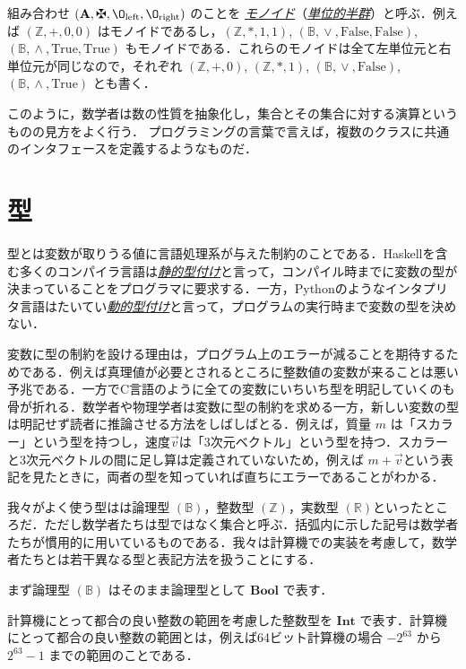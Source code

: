 \documentclass[a4paper]{jsbook}
\newcommand{\programminglanguage}[1]{\textsf{#1}}
\newcommand{\clang}{\programminglanguage{C}}
\newcommand{\haskell}{\programminglanguage{Haskell}}
\newcommand{\python}{\programminglanguage{Python}}
\newcommand{\keyword}[1]{{\underline{\emph{#1}}}}
\newcommand{\mSpecialConst}[1]{\mathrm{#1}} %
\newcommand{\mTrue}{\mSpecialConst{True}}
\newcommand{\mFalse}{\mSpecialConst{False}}
\newcommand{\mZero}{\O}
\newcommand{\mSpecialSub}[1]{\text{#1}}
\newcommand{\mLeft}{\mSpecialSub{left}}
\newcommand{\mRight}{\mSpecialSub{right}}
\newcommand{\mSet}[1]{\mathbf{#1}}
\newcommand{\mSpecialSet}[1]{\mathbb{#1}} %
\newcommand{\mRSet}{\mSpecialSet{R}}
\newcommand{\mZSet}{\mSpecialSet{Z}}
\newcommand{\mBSet}{\mSpecialSet{B}}
\newcommand{\mTupleWith}[1]{\left(#1\right)}
\newcommand{\mType}[1]{\mathbf{#1}}
\newcommand{\mBoolType}{\mType{Bool}}
\newcommand{\mIntType}{\mType{Int}}
\DeclareMathOperator{\mPlus}{\maltese}
\DeclareMathOperator{\mLogicalAnd}{\wedge}
\DeclareMathOperator{\mLogicalOr}{\vee}
\begin{document}
組み合わせ $\mTupleWith{\mSet{A},\mPlus,\mZero_\mLeft,\mZero_\mRight}$ のことを
\keyword{モノイド}（\keyword{単位的半群}）と呼ぶ．例えば $\mTupleWith{\mZSet,+,0,0}$ はモノイドであるし，$\mTupleWith{\mZSet,*,1,1}$, $\mTupleWith{\mBSet,\mLogicalOr,\mFalse,\mFalse}$, $\mTupleWith{\mBSet,\mLogicalAnd,\mTrue,\mTrue}$ もモノイドである．これらのモノイドは全て左単位元と右単位元が同じなので，それぞれ $\mTupleWith{\mZSet,+,0}$, $\mTupleWith{\mZSet,*,1}$, $\mTupleWith{\mBSet,\mLogicalOr,\mFalse}$, $\mTupleWith{\mBSet,\mLogicalAnd,\mTrue}$ とも書く．

このように，数学者は数の性質を抽象化し，集合とその集合に対する演算というものの見方をよく行う．
プログラミングの言葉で言えば，複数のクラスに共通のインタフェースを定義するようなものだ．

\section{型}

型とは変数が取りうる値に言語処理系が与えた制約のことである．\haskell を含む多くのコンパイラ言語は\keyword{静的型付け}と言って，コンパイル時までに変数の型が決まっていることをプログラマに要求する．一方，\python のようなインタプリタ言語はたいてい\keyword{動的型付け}と言って，プログラムの実行時まで変数の型を決めない．

変数に型の制約を設ける理由は，プログラム上のエラーが減ることを期待するためである．例えば真理値が必要とされるところに整数値の変数が来ることは悪い予兆である．一方で\clang 言語のように全ての変数にいちいち型を明記していくのも骨が折れる．数学者や物理学者は変数に型の制約を求める一方，新しい変数の型は明記せず読者に推論させる方法をしばしばとる．例えば，質量 $m$ は「スカラー」という型を持つし，速度$\vec{v}$は「3次元ベクトル」という型を持つ．スカラーと3次元ベクトルの間に足し算は定義されていないため，例えば $m+\vec{v}$という表記を見たときに，両者の型を知っていれば直ちにエラーであることがわかる．

我々がよく使う型はは論理型 $(\mBSet)$，整数型 $(\mZSet)$，実数型 $(\mRSet)$といったところだ．ただし数学者たちは型ではなく集合と呼ぶ．括弧内に示した記号は数学者たちが慣用的に用いているものである．我々は計算機での実装を考慮して，数学者たちとは若干異なる型と表記方法を扱うことにする．

まず論理型 $(\mBSet)$ はそのまま論理型として $\mBoolType$ で表す．

計算機にとって都合の良い整数の範囲を考慮した整数型を $\mIntType$ で表す．計算機にとって都合の良い整数の範囲とは，例えば64ビット計算機の場合 $-2^{63}$ から $2^{63}-1$ までの範囲のことである．
\end{document}
